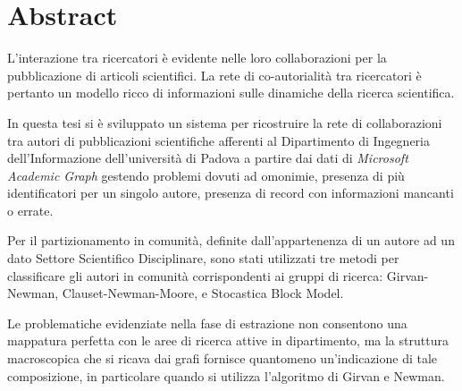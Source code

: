\documentclass[12pt,a4paper,twoside]{report}
\begin{document}
\whitePage


\tableofcontents





\whitePage



\newpage
{}
\setcounter{page}{1}
\section*{Abstract} \label{abstract} %

L'interazione tra ricercatori è evidente nelle loro collaborazioni per la pubblicazione di articoli
scientifici. La rete di co-autorialità tra ricercatori è pertanto un modello ricco di informazioni
sulle dinamiche della ricerca scientifica.

In questa tesi si è sviluppato un sistema per ricostruire la rete di collaborazioni tra autori di
pubblicazioni scientifiche afferenti al Dipartimento di Ingegneria dell’Informazione dell’università
di Padova a partire dai dati di \textit{Microsoft Academic Graph} gestendo problemi dovuti ad
omonimie, presenza di più identificatori per un singolo autore, presenza di record con informazioni
mancanti o errate.

Per il partizionamento in comunità, definite dall’appartenenza di un autore ad un dato Settore
Scientifico Disciplinare, sono stati utilizzati tre metodi per classificare gli autori in comunità
corrispondenti ai gruppi di ricerca: Girvan-Newman, Clauset-Newman-Moore, e Stocastica Block Model.

Le problematiche evidenziate nella fase di estrazione non consentono una mappatura perfetta con le
aree di ricerca attive in dipartimento, ma la struttura macroscopica che si ricava dai grafi
fornisce quantomeno un’indicazione di tale composizione, in particolare quando si utilizza
l’algoritmo di Girvan e Newman.

\whitePage
\end{document}

